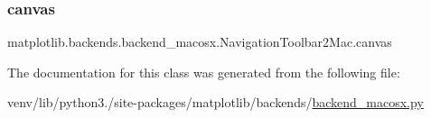 \subsubsection{\texorpdfstring{canvas}{canvas}}
{\footnotesize\ttfamily matplotlib.\+backends.\+backend\+\_\+macosx.\+Navigation\+Toolbar2\+Mac.\+canvas}



The documentation for this class was generated from the following file\+:\begin{DoxyCompactItemize}
\item 
venv/lib/python3./site-\/packages/matplotlib/backends/\hyperlink{backend__macosx_8py}{backend\+\_\+macosx.\+py}\end{DoxyCompactItemize}
